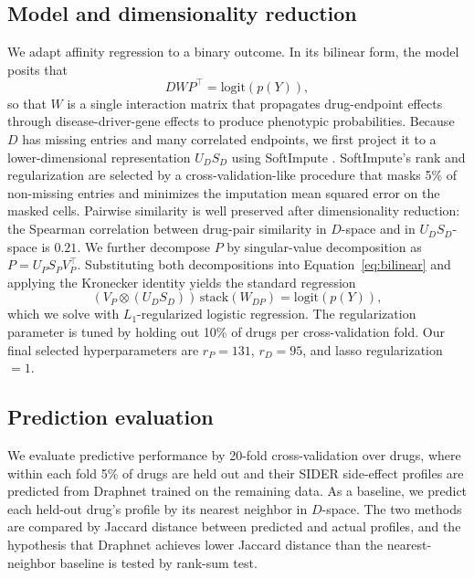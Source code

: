 \documentclass[11pt]{article}
\begin{document}
\subsection{Model and dimensionality reduction}

We adapt affinity regression \citep{osmanbeyoglu2014affinity} to a
binary outcome. In its bilinear form, the model posits that
\begin{equation}
D W P^{\top} = \mathrm{logit}(p(Y)),
\label{eq:bilinear}
\end{equation}
so that $W$ is a single interaction matrix that propagates drug-endpoint
effects through disease-driver-gene effects to produce phenotypic
probabilities. Because $D$ has missing entries and many correlated
endpoints, we first project it to a lower-dimensional
representation $U_D S_D$ using SoftImpute
\citep{mazumder2010softimpute}. SoftImpute's rank and regularization are
selected by a cross-validation-like procedure that masks 5\% of
non-missing entries and minimizes the imputation mean squared error on
the masked cells. Pairwise similarity is well preserved after
dimensionality reduction: the Spearman correlation between drug-pair
similarity in $D$-space and in $U_D S_D$-space is $0.21$. We further
decompose $P$ by singular-value decomposition as
$P = U_P S_P V_P^{\top}$. Substituting both decompositions into
Equation~\ref{eq:bilinear} and applying the Kronecker identity yields
the standard regression
\begin{equation}
(V_P \otimes (U_D S_D))\, \mathrm{stack}(W_{DP}) = \mathrm{logit}(p(Y)),
\label{eq:kron}
\end{equation}
which we solve with $L_1$-regularized logistic regression. The
regularization parameter is tuned by holding out 10\% of drugs per
cross-validation fold. Our final selected hyperparameters are
$r_P = 131$, $r_D = 95$, and lasso regularization $= 1$.

\subsection{Prediction evaluation}

We evaluate predictive performance by 20-fold cross-validation over
drugs, where within each fold 5\% of drugs are held out and their SIDER
side-effect profiles are predicted from Draphnet trained on the
remaining data. As a baseline, we predict each held-out drug's profile
by its nearest neighbor in $D$-space. The two methods are compared by
Jaccard distance between predicted and actual profiles, and the
hypothesis that Draphnet achieves lower Jaccard distance than the
nearest-neighbor baseline is tested by rank-sum test.
\end{document}
